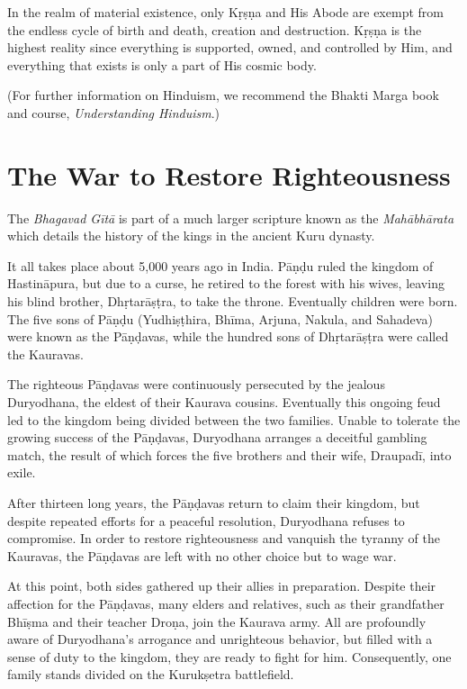 \documentclass[12pt, twoside, openright]{memoir}
\begin{document}
In the realm of material existence, only Kṛṣṇa and His Abode are exempt from the endless cycle of birth and death, creation and destruction. Kṛṣṇa is the highest reality since everything is supported, owned, and controlled by Him, and everything that exists is only a part of His cosmic body.

(For further information on Hinduism, we recommend the Bhakti Marga book and course, \textit{Understanding Hinduism}.)

\section{The War to Restore Righteousness}\label{sec-the-war-to-restore-righteousness}

The \textit{Bhagavad Gītā} is part of a much larger scripture known as the \textit{Mahābhārata} which details the history of the kings in the ancient Kuru dynasty. 

It all takes place about 5,000 years ago in India. Pāṇḍu ruled the kingdom of Hastināpura, but due to a curse, he retired to the forest with his wives, leaving his blind brother, Dhṛtarāṣṭra, to take the throne. Eventually children were born. The five sons of Pāṇḍu (Yudhiṣṭhira, Bhīma, Arjuna, Nakula, and Sahadeva) were known as the Pāṇḍavas, while the hundred sons of Dhṛtarāṣṭra were called the Kauravas. 

The righteous Pāṇḍavas were continuously persecuted by the jealous Duryodhana, the eldest of their Kaurava cousins. Eventually this ongoing feud led to the kingdom being divided between the two families. Unable to tolerate the growing success of the Pāṇḍavas, Duryodhana arranges a deceitful gambling match, the result of which forces the five brothers and their wife, Draupadī, into exile.

After thirteen long years, the Pāṇḍavas return to claim their kingdom, but despite repeated efforts for a peaceful resolution, Duryodhana refuses to compromise. In order to restore righteousness and vanquish the tyranny of the Kauravas, the Pāṇḍavas are left with no other choice but to wage war.

At this point, both sides gathered up their allies in preparation. Despite their affection for the Pāṇḍavas, many elders and relatives, such as their grandfather Bhīṣma and their teacher Droṇa, join the Kaurava army. All are profoundly aware of Duryodhana’s arrogance and unrighteous behavior, but filled with a sense of duty to the kingdom, they are ready to fight for him. Consequently, one family stands divided on the Kurukṣetra battlefield. 
\end{document}
